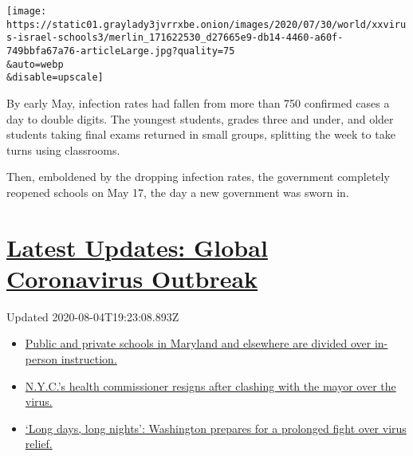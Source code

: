 \texttt{[image: https://static01.graylady3jvrrxbe.onion/images/2020/07/30/world/xxvirus-israel-schools3/merlin\_171622530\_d27665e9-db14-4460-a60f-749bbfa67a76-articleLarge.jpg?quality=75\\\&auto=webp\\\&disable=upscale]}

By early May, infection rates had fallen from more than 750 confirmed
cases a day to double digits. The youngest students, grades three and
under, and older students taking final exams returned in small groups,
splitting the week to take turns using classrooms.

Then, emboldened by the dropping infection rates, the government
completely reopened schools on May 17, the day a new government was
sworn in.

\hypertarget{latest-updates-global-coronavirus-outbreak}{%
\section{\texorpdfstring{\href{https://www.nytimes3xbfgragh.onion/2020/08/04/world/coronavirus-cases.html?action=click\&pgtype=Article\&state=default\&region=MAIN_CONTENT_1\&context=storylines_live_updates}{Latest
Updates: Global Coronavirus
Outbreak}}{Latest Updates: Global Coronavirus Outbreak}}\label{latest-updates-global-coronavirus-outbreak}}

Updated 2020-08-04T19:23:08.893Z

\begin{itemize}
\tightlist
\item
  \href{https://www.nytimes3xbfgragh.onion/2020/08/04/world/coronavirus-cases.html?action=click\&pgtype=Article\&state=default\&region=MAIN_CONTENT_1\&context=storylines_live_updates\#link-4825b93}{Public
  and private schools in Maryland and elsewhere are divided over
  in-person instruction.}
\item
  \href{https://www.nytimes3xbfgragh.onion/2020/08/04/world/coronavirus-cases.html?action=click\&pgtype=Article\&state=default\&region=MAIN_CONTENT_1\&context=storylines_live_updates\#link-4d1eafa8}{N.Y.C.'s
  health commissioner resigns after clashing with the mayor over the
  virus.}
\item
  \href{https://www.nytimes3xbfgragh.onion/2020/08/04/world/coronavirus-cases.html?action=click\&pgtype=Article\&state=default\&region=MAIN_CONTENT_1\&context=storylines_live_updates\#link-6b644638}{`Long
  days, long nights': Washington prepares for a prolonged fight over
  virus relief.}
\end{itemize}

